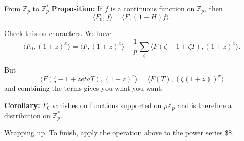 \documentclass[
  ignorenonframetext,
]{beamer}
\begin{document}
\begin{frame}{From \(\mathbb{Z}_p\) to \(\mathbb{Z}_p^{*}\)}
\protect\hypertarget{from-mathbbz_p-to-mathbbz_p-1}{}
\textbf{Proposition:} If \(f\) is a continuous function on
\(\mathbb{Z}_p\), then \[
\langle F_0, f\rangle = \langle F, (1-H)f\rangle.
\]

Check this on characters. We have \[
\langle F_0, (1+z)^x\rangle = \langle F,(1+z)^x\rangle -\frac{1}{p}\sum_{\zeta}\langle F(\zeta-1+\zeta T),(1+z)^x\rangle.
\]

But \[
\langle F(\zeta-1+zeta T),(1+z)^x\rangle=\langle F(T),(\zeta (1+z))^x\rangle
\] and combining the terms gives you what you want.

\textbf{Corollary:} \(F_0\) vanishes on functions supported on
\(p\mathbb{Z}_p\) and is therefore a distribution on
\(\mathbb{Z}_p^{*}\).
\end{frame}

\begin{frame}{Wrapping up.}
\protect\hypertarget{wrapping-up.}{}
To finish, apply the operation above to the power series \$\$.
\end{frame}
\end{document}
